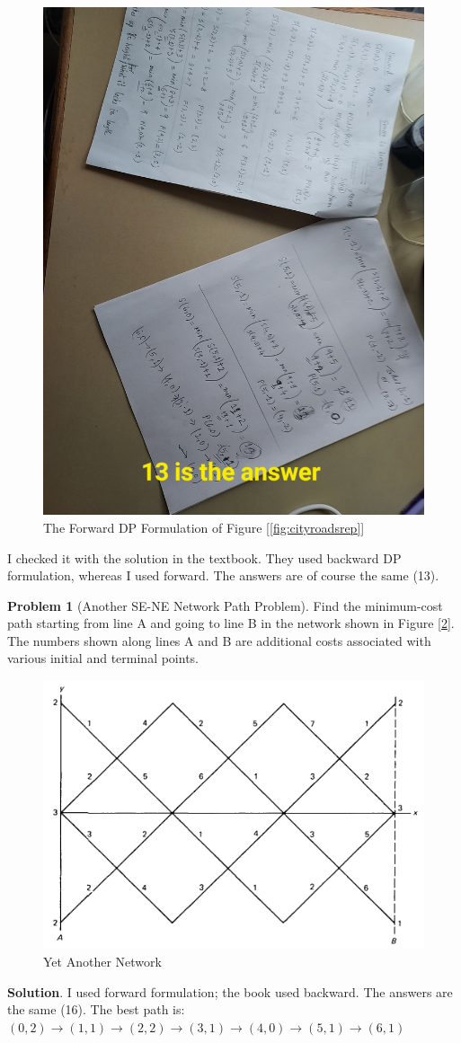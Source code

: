 \documentclass[english,notitlepage,smartquotes]{hgbreport}
\theoremstyle{definition}
\theoremstyle{definition}
\newtheorem{problem}{Problem}
\theoremstyle{remark}
\theoremstyle{definition}
\theoremstyle{plain}
\theoremstyle{definition}
\begin{document}
\begin{figure}[H]
\centering
\includegraphics[width=.5\textwidth]{forward-dp-sol}
\caption{The Forward DP Formulation of Figure [\ref{fig:cityroadsrep}]}
\label{fig:forwarddpsol1}
\end{figure}

I checked it with the solution in the textbook. They used backward DP formulation, whereas I used forward. The answers are of course the same (13).

\begin{problem}[Another SE-NE Network Path Problem]
Find the minimum-cost path starting from line A and going to line B in the network shown in Figure [\ref{fig:line-to-line}]. The numbers shown along lines A and B are additional costs associated with various initial and terminal points.

\begin{figure}[H]
\centering
\includegraphics[width=.5\textwidth]{another-network}
\caption{Yet Another Network}
\label{fig:line-to-line}
\end{figure}

\end{problem}

\textbf{Solution}.
I used forward formulation; the book used backward. The answers are the same (16). The best path is: $(0,2)\rightarrow(1,1)\rightarrow(2,2)\rightarrow(3,1)\rightarrow(4,0)\rightarrow(5,1)\rightarrow(6,1)$
\end{document}
